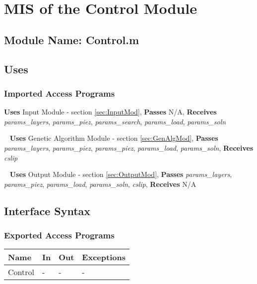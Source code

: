 \documentclass[12pt, titlepage]{article}
\begin{document}

\section{MIS of the Control Module}

\subsection{Module Name: Control.m}

\subsection{Uses}

\subsubsection{Imported Access Programs}

\noindent
\textbf{Uses} Input Module - section \ref{sec:InputMod},
\textbf{Passes} N/A, \textbf{Receives} \textit{params\_layers},
\textit{params\_piez}, \textit{params\_search},
\textit{params\_load}, \textit{params\_soln}

~\newline\noindent
\textbf{Uses} Genetic Algorithm Module - section \ref{sec:GenAlgMod},
\textbf{Passes} \textit{params\_layers}, \textit{params\_piez},
\textit{params\_piez}, \textit{params\_load},
\textit{params\_soln}, \textbf{Receives} \textit{cslip}

~\newline\noindent
\textbf{Uses} Output Module - section \ref{sec:OutputMod},
\textbf{Passes} \textit{params\_layers}, \textit{params\_piez},
\textit{params\_load}, \textit{params\_soln},
\textit{cslip}, \textbf{Receives} N/A

\subsection{Interface Syntax}

\subsubsection{Exported Access Programs}

\begin{center}
\renewcommand*{\arraystretch}{1.5}
\begin{tabular} {|p{}| p{}
    |p{} |p{}|}

  \hline \textbf{Name} & \textbf{In} & \textbf{Out} &
  \textbf{Exceptions} \\ \hline

  Control & - & - & - \\ \hline
\end{tabular}
\end{center}
\end{document}
